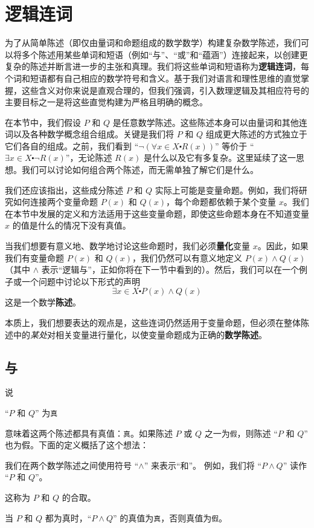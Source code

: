 \section{逻辑连词}

为了从简单陈述（即仅由量词和命题组成的数学数学）构建复杂数学陈述，我们可以将多个陈述用某些单词和短语（例如``与''、``或''和``蕴涵''）连接起来，以创建更复杂的陈述并断言进一步的主张和真理。我们将这些单词和短语称为\textbf{逻辑连词}，每个词和短语都有自己相应的数学符号和含义。基于我们对语言和理性思维的直觉掌握，这些含义对你来说是直观合理的，但我们强调，引入数理逻辑及其相应符号的主要目标之一是将这些直觉构建为严格且明确的概念。

在本节中，我们假设 $P$ 和 $Q$ 是任意数学陈述。这些陈述本身可以由量词和其他连词以及各种数学概念组合组成。关键是我们将 $P$ 和 $Q$ 组成更大陈述的方式独立于它们各自的组成。之前，我们看到 ``$\neg(\forall x \in X \centerdot R(x))$'' 等价于 ``$\exists x \in X \centerdot \neg R(x)$''，无论陈述 $R(x)$ 是什么以及它有多复杂。这里延续了这一思想。我们可以讨论如何组合两个陈述，而无需单独了解它们是什么。

我们还应该指出，这些成分陈述 $P$ 和 $Q$ 实际上可能是变量命题。例如，我们将研究如何连接两个变量命题 $P(x)$ 和 $Q(x)$，每个命题都依赖于某个变量 $x$。我们在本节中发展的定义和方法适用于这些变量命题，即使这些命题本身在不知道变量 $x$ 的值是什么的情况下没有真值。

当我们想要有意义地、数学地讨论这些命题时，我们必须\textbf{量化}变量 $x$。因此，如果我们有变量命题 $P(x)$ 和 $Q(x)$，我们仍然可以有意义地定义 $P(x) \land Q(x)$（其中 $\land$ 表示``逻辑与''，正如你将在下一节中看到的）。然后，我们可以在一个例子或一个问题中讨论以下形式的声明
\[\exists x \in X \centerdot P(x) \land Q(x)\]
这是一个数学\textbf{陈述}。

本质上，我们想要表达的观点是，这些连词仍然适用于变量命题，但必须在整体陈述中的\emph{某处}对相关变量进行量化，以使变量命题成为正确的\textbf{数学陈述}。

\subsection{与}

说
\begin{center}
    ``$P$ 和 $Q$'' 为\verb|真|
\end{center} 
意味着这两个陈述都具有真值：\verb|真|。如果陈述 $P$ 或 $Q$ 之一为\verb|假|，则陈述 ``$P$ 和 $Q$'' 也为假。下面的定义概括了这个想法：

\begin{definition}
    我们在两个数学陈述之间使用符号 ``$\land$'' 来表示``和''。 例如，我们将 ``$P \land Q$'' 读作 ``$P$ 和 $Q$''。

    这称为 $P$ 和 $Q$ 的合取。

    当 $P$ 和 $Q$ 都为真时，``$P \land Q$'' 的真值为\verb|真|，否则真值为\verb|假|。
\end{definition}

